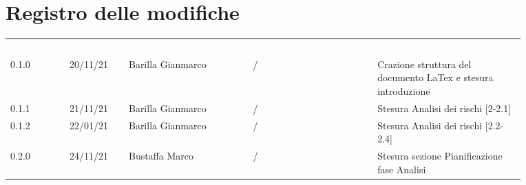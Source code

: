 \section*{Registro delle modifiche}

{\renewcommand{\arraystretch}{1.5}
\begin{tabular}{p{0.10\linewidth}p{0.10\linewidth}p{0.21\linewidth}p{0.21\linewidth}p{0.25\linewidth}}
	\rowcolor[RGB]{33, 73, 50}
	\textcolor{white}{\textbf{Versione}} & \textcolor{white}{\textbf{Data}} & \textcolor{white}
	{\textbf{Redattore}} & \textcolor{white}{\textbf{Verificatore}} & \textcolor{white}
	{\textbf{Descrizione}}\\
	\rowcolor[RGB]{216, 235, 171}
	0.1.0 & 20/11/21 & Barilla Gianmarco & / & Crazione struttura del documento LaTex e stesura introduzione\\
	\rowcolor[RGB]{233, 245, 206}
	0.1.1 & 21/11/21 & Barilla Gianmarco & / & Stesura Analisi dei rischi [2-2.1]\\
	\rowcolor[RGB]{216, 235, 171}
	0.1.2 & 22/01/21 & Barilla Gianmarco& / & Stesura Analisi dei rischi [2.2-2.4]\\
	\rowcolor[RGB]{233, 245, 206}
	0.2.0 & 24/11/21 & Bustaffa Marco& / & Stesura sezione Pianificazione fase Analisi\\
	
\end{tabular}	
}